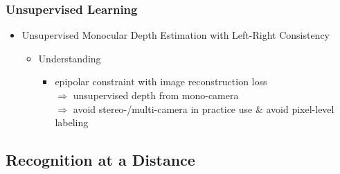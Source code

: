 \subsubsection{Unsupervised Learning}
\begin{itemize}
\item Unsupervised Monocular Depth Estimation with Left-Right Consistency
	\begin{itemize}
	\item Understanding
		\begin{itemize}
		\item epipolar constraint with image reconstruction loss \\
		$\Rightarrow$ unsupervised depth from mono-camera \\
		$\Rightarrow$ avoid stereo-/multi-camera in practice use \& avoid pixel-level labeling
		\end{itemize}
	\end{itemize}
\end{itemize}

\subsection{Recognition at a Distance}
